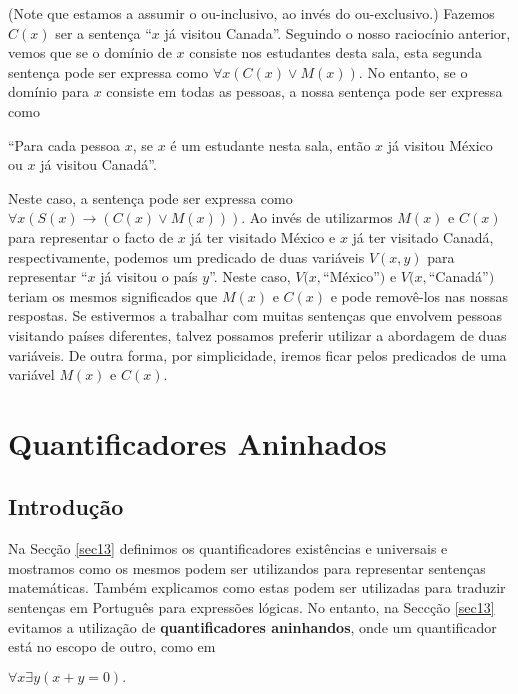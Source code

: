 \begin{exmp}
\begin{description}
(Note que estamos a assumir o ou-inclusivo, ao invés do ou-exclusivo.) Fazemos
$C(x)$ ser a sentença ``$x$ já visitou Canada''. Seguindo o nosso raciocínio
anterior, vemos que se o domínio de $x$ consiste nos estudantes desta sala, esta
segunda sentença pode ser expressa como $\forall x(C(x) \lor M(x))$. No entanto,
se o domínio para $x$ consiste em todas as pessoas, a nossa sentença pode ser
expressa como

\begin{center}
``Para cada pessoa $x$, se $x$ é um estudante nesta sala, então $x$ já visitou
México ou $x$ já visitou Canadá''.
\end{center}

Neste caso, a sentença pode ser expressa como $\forall x(S(x) \to (C(x) \lor
M(x)))$.
Ao invés de utilizarmos $M(x)$ e $C(x)$ para representar o facto de $x$ já ter
visitado México e $x$ já ter visitado Canadá, respectivamente, podemos um
predicado de duas variáveis $V(x,y)$ para representar ``$x$ já visitou o país
$y$''. Neste caso, $V(x, $``México''$)$ e $V(x, $``Canadá''$)$ teriam os mesmos
significados que $M(x)$ e $C(x)$ e pode removê-los nas nossas respostas. Se
estivermos a trabalhar com muitas sentenças que envolvem pessoas visitando
países diferentes, talvez possamos preferir utilizar a abordagem de duas
variáveis. De outra forma, por simplicidade, iremos ficar pelos predicados de
uma variável $M(x)$ e $C(x)$.

\end{description}
\end{exmp}

\section{Quantificadores Aninhados}
\label{sec14}
\subsection*{Introdução}

Na Secção \ref{sec13} definimos os quantificadores existências e universais e
mostramos como os mesmos podem ser utilizandos para representar sentenças
matemáticas. Também explicamos como estas podem ser utilizadas para traduzir
sentenças em Português para expressões lógicas. No entanto, na Seccção
\ref{sec13} evitamos a utilização de \textbf{quantificadores aninhandos}, onde
um quantificador está no escopo de outro, como em

\begin{center}
$\forall x\exists y(x+y=0).$
\end{center}

